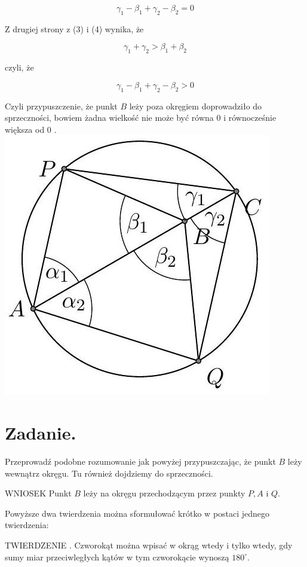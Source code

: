 \documentclass[10pt]{article}
\begin{document}
\[
\gamma_{1}-\beta_{1}+\gamma_{2}-\beta_{2}=0
\]

Z drugiej strony z (3) i (4) wynika, że

\[
\gamma_{1}+\gamma_{2}>\beta_{1}+\beta_{2}
\]

czyli, że

\[
\gamma_{1}-\beta_{1}+\gamma_{2}-\beta_{2}>0
\]

Czyli przypuszczenie, że punkt \(B\) leży poza okręgiem doprowadziło do sprzeczności, bowiem żadna wielkość nie może być równa 0 i równocześnie większa od 0 .\\
\includegraphics[max width=\textwidth, center]{2024_11_21_71f62bd117d375398909g-198}

\section*{Zadanie.}
Przeprowadź podobne rozumowanie jak powyżej przypuszczając, że punkt \(B\) leży wewnątrz okręgu. Tu również dojdziemy do sprzeczności.

WNIOSEK Punkt \(B\) leży na okręgu przechodzącym przez punkty \(P, A\) i \(Q\).

Powyższe dwa twierdzenia można sformułować krótko w postaci jednego twierdzenia:

TWIERDZENIE . Czworokąt można wpisać w okrąg wtedy i tylko wtedy, gdy sumy miar przeciwległych kątów w tym czworokącie wynoszą \(180^{\circ}\).
\end{document}
